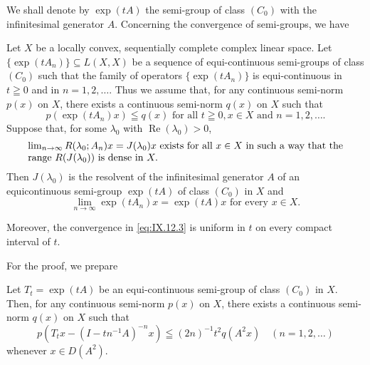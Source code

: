 We shall denote by $\exp(tA)$ the semi-group of class $(C_{0})$ with the infinitesimal generator $A$. Concerning the convergence of semi-groups, we have 

\begin{theorem}\label{thm:IX.12.Theorem.1} Let $X$ be a locally convex, sequentially complete complex linear space. Let $\{\exp(tA_{n})\} \subseteq L(X, X)$ be a sequence of equi-continuous semi-groups of class $(C_{0})$ such that the family of operators $\{\exp(tA_{n})\}$ is equi-continuous in $t \geqq 0$ and in $n = 1, 2, \ldots$. Thus we assume that, for any continuous semi-norm $p(x)$ on $X$, there exists a continuous semi-norm $q(x)$ on $X$ such that 
\begin{equation}\label{eq:IX.12.1}
p(\exp(tA_{n})x) \leqq q(x) \text{ for all } t \geqq 0, x \in X \text{ and } n = 1, 2, \ldots.
\end{equation}
Suppose that, for some $\lambda_0$ with $\operatorname{Re}(\lambda_0) > 0$, 
\begin{equation}
\label{eq:IX.12.2}
\begin{minipage}{0.92\linewidth}
\everymath{}\let\limits\nolimits
$\lim\limits_{n\to \infty}R(\lambda_0;A_n)x = J(\lambda_0)x$ exists for all $x\in X$ in such a way that the range $R(J(\lambda_0))$ is dense in $X.$
\end{minipage}
\end{equation}
Then $J(\lambda_0)$ is the resolvent of the infinitesimal generator $A$ of an equicontinuous semi-group $\exp(tA)$ of class $(C_0)$ in $X$ and 
\begin{equation}\label{eq:IX.12.3}
\lim\limits _{n \rightarrow \infty} \exp (t A _{n}) x = \exp (t A) x \text{ for every } x \in X.
\end{equation}
\end{theorem}

Moreover, the convergence in \eqref{eq:IX.12.3} is uniform in $t$ on every compact interval of $t$. 

For the proof, we prepare 

\begin{lemmau} Let $T_{t} = \exp(tA)$ be an equi-continuous semi-group of class $(C_0)$ in $X$. Then, for any continuous semi-norm $p(x)$ on $X$, there exists a continuous semi-norm $q(x)$ on $X$ such that 
\begin{equation}\label{eq:IX.12.4}
p\left(T_{t}x - (I - t n^{-1}A)^{-n}x\right) \leqq (2n)^{-1}t^{2}q\left(A^{2}x\right) \quad (n = 1, 2, \ldots)
\end{equation}
whenever $x \in D(A^2)$. 
\end{lemmau}


